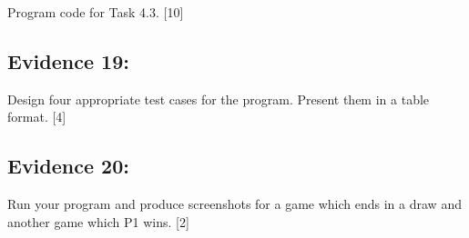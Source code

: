 Program code for Task 4.3.\hfill{} {[}10{]}

\subsection*{Evidence 19: }

Design four appropriate test cases for the program. Present them in
a table format. \hfill{}{[}4{]}

\subsection*{Evidence 20: }

Run your program and produce screenshots for a game which ends in
a draw and another game which P1 wins.\hfill{} {[}2{]}